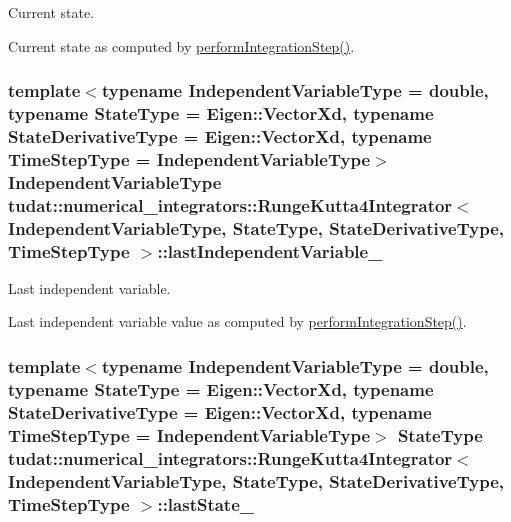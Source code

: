 Current state. 

Current state as computed by \hyperlink{classtudat_1_1numerical__integrators_1_1RungeKutta4Integrator_abaa09d78b7b023d900cecb8fcbdcdca6}{perform\+Integration\+Step()}. 
\subsubsection[{\texorpdfstring{last\+Independent\+Variable\+\_\+}{lastIndependentVariable_}}]{\setlength{\rightskip}{0pt plus 5cm}template$<$typename Independent\+Variable\+Type  = double, typename State\+Type  = Eigen\+::\+Vector\+Xd, typename State\+Derivative\+Type  = Eigen\+::\+Vector\+Xd, typename Time\+Step\+Type  = Independent\+Variable\+Type$>$ Independent\+Variable\+Type {\bf tudat\+::numerical\+\_\+integrators\+::\+Runge\+Kutta4\+Integrator}$<$ Independent\+Variable\+Type, State\+Type, State\+Derivative\+Type, Time\+Step\+Type $>$\+::last\+Independent\+Variable\+\_\+\hspace{0.3cm}{\ttfamily [protected]}}\hypertarget{classtudat_1_1numerical__integrators_1_1RungeKutta4Integrator_aa9662c91e40f32f2d64aac3354364780}{}\label{classtudat_1_1numerical__integrators_1_1RungeKutta4Integrator_aa9662c91e40f32f2d64aac3354364780}


Last independent variable. 

Last independent variable value as computed by \hyperlink{classtudat_1_1numerical__integrators_1_1RungeKutta4Integrator_abaa09d78b7b023d900cecb8fcbdcdca6}{perform\+Integration\+Step()}. 
\subsubsection[{\texorpdfstring{last\+State\+\_\+}{lastState_}}]{\setlength{\rightskip}{0pt plus 5cm}template$<$typename Independent\+Variable\+Type  = double, typename State\+Type  = Eigen\+::\+Vector\+Xd, typename State\+Derivative\+Type  = Eigen\+::\+Vector\+Xd, typename Time\+Step\+Type  = Independent\+Variable\+Type$>$ State\+Type {\bf tudat\+::numerical\+\_\+integrators\+::\+Runge\+Kutta4\+Integrator}$<$ Independent\+Variable\+Type, State\+Type, State\+Derivative\+Type, Time\+Step\+Type $>$\+::last\+State\+\_\+\hspace{0.3cm}{\ttfamily [protected]}}\hypertarget{classtudat_1_1numerical__integrators_1_1RungeKutta4Integrator_af20fd47fb589df540481aaf47c093efd}{}\label{classtudat_1_1numerical__integrators_1_1RungeKutta4Integrator_af20fd47fb589df540481aaf47c093efd}


